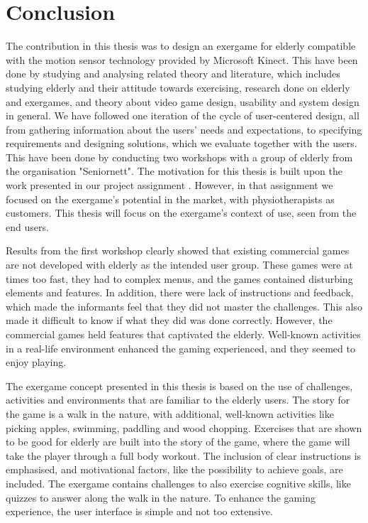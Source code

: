 \chapter{Conclusion}

The contribution in this thesis was to design an exergame for elderly compatible with the motion sensor technology provided by Microsoft Kinect. This have been done by studying and analysing related theory and literature, which includes studying elderly and their attitude towards exercising, research done on elderly and exergames, and theory about video game design, usability and system design in general. We have followed one iteration of the cycle of user-centered design, all from gathering information about the users' needs and expectations, to specifying requirements and designing solutions, which we evaluate together with the users. This have been done by conducting two workshops with a group of elderly from the organisation "Seniornett". The motivation for this thesis is built upon the work presented in our project assignment \cite{project}. However, in that assignment we focused on the exergame's potential in the market, with physiotherapists as customers. This thesis will focus on the exergame's context of use, seen from the end users. 

Results from the first workshop clearly showed that existing commercial games are not developed with elderly as the intended user group. These games were at times too fast, they had to complex menus, and the games contained disturbing elements and features. In addition, there were lack of instructions and feedback, which made the informants feel that they did not master the challenges. This also made it difficult to know if what they did was done correctly. However, the commercial games held features that captivated the elderly. Well-known activities in a real-life environment enhanced the gaming experienced, and they seemed to enjoy playing.     

The exergame concept presented in this thesis is based on the use of challenges, activities and environments that are familiar to the elderly users. The story for the game is a walk in the nature, with additional, well-known activities like picking apples, swimming, paddling and wood chopping. Exercises that are shown to be good for elderly are built into the story of the game, where the game will take the player through a full body workout. The inclusion of clear instructions is emphasised, and motivational factors, like the possibility to achieve goals, are included. The exergame contains challenges to also exercise cognitive skills, like quizzes to answer along the walk in the nature. To enhance the gaming experience, the user interface is simple and not too extensive.

